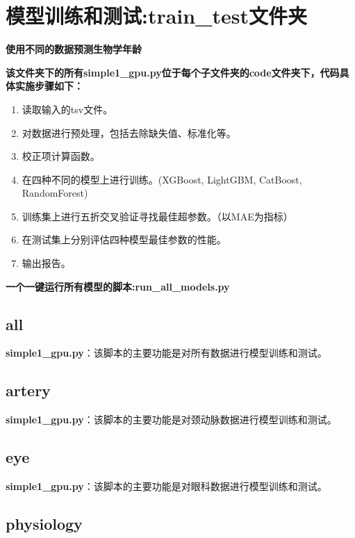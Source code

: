 \documentclass[UTF8]{report}
\theoremstyle{MyLineTheoremStyle} %
\theoremstyle{MyBlockTheoremStyle} %
\theoremstyle{MySubsubsectionStyle} %
\begin{document}
\section{模型训练和测试:train\_test文件夹}
\textbf{使用不同的数据预测生物学年龄}\par
\textbf{该文件夹下的所有simple1\_gpu.py位于每个子文件夹的code文件夹下，代码具体实施步骤如下：}
\begin{enumerate}
    \item 读取输入的tsv文件。
    \item 对数据进行预处理，包括去除缺失值、标准化等。
    \item 校正项计算函数。
    \item 在四种不同的模型上进行训练。(XGBoost, LightGBM, CatBoost, RandomForest)
    \item 训练集上进行五折交叉验证寻找最佳超参数。（以MAE为指标）
    \item 在测试集上分别评估四种模型最佳参数的性能。
    \item 输出报告。
\end{enumerate}
\textbf{一个一键运行所有模型的脚本:run\_all\_models.py}


\subsection*{all}

\textbf{simple1\_gpu.py}：该脚本的主要功能是对所有数据进行模型训练和测试。

\subsection*{artery}

\textbf{simple1\_gpu.py}：该脚本的主要功能是对颈动脉数据进行模型训练和测试。

\subsection*{eye}

\textbf{simple1\_gpu.py}：该脚本的主要功能是对眼科数据进行模型训练和测试。

\subsection*{physiology}
\end{document}
